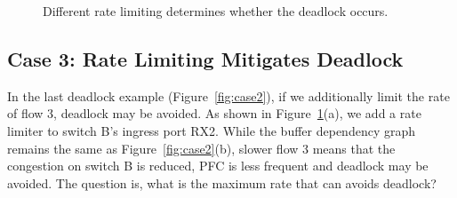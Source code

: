 \begin{figure}[t]
\centering

\vspace{-0.15in}
\caption{Different rate limiting determines whether the deadlock occurs.}
\vspace{-0.15in}
\label{fig:case3}
\end{figure}

\secspace
\subsection{Case 3: Rate Limiting Mitigates Deadlock}
\secspace

In the last deadlock example (Figure~\ref{fig:case2}), if we additionally limit the rate of flow 3, deadlock
may be avoided.  As shown in Figure~\ref{fig:case3}(a), we add a rate limiter to switch B's
ingress port RX2. While the buffer dependency graph remains the same as Figure~\ref{fig:case2}(b), 
slower flow 3 means that the congestion on switch B is reduced, PFC is less
frequent and deadlock may be avoided. The question is, what is the maximum rate that can
avoids deadlock?

